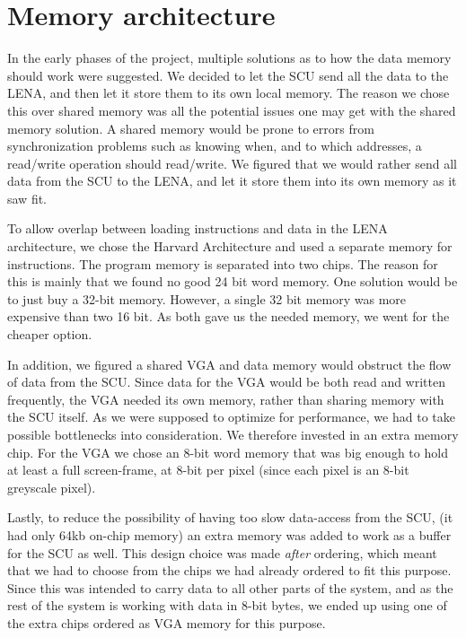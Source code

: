 \section {Memory architecture}

In the early phases of the project,
multiple solutions as to how the data memory should work were suggested. We
decided to let the \ac{SCU} send all the data to the \ac{LENA}, and then let it store
them to its own local memory. The reason we chose this over shared memory was
all the potential issues one may get with the shared memory solution. A shared memory
would be prone to errors from synchronization problems such as knowing when,
and to which addresses, a read/write operation should read/write. We figured
that we would rather send all data from the \ac{SCU} to the \ac{LENA}, and let it
store them into its own memory as it saw fit.

To allow overlap between loading instructions and data in the LENA
architecture, we chose the Harvard Architecture and used a separate memory for
instructions. The program memory is
separated into two chips. The reason for this is mainly that we found no good 24
bit word memory. One solution would be to just buy a 32-bit memory. However, a single 32
bit memory was more expensive than two 16 bit. As both gave us the needed memory,
we went for the cheaper option.

In addition, we figured a shared \ac{VGA} and data memory would obstruct the flow
of data from the \ac{SCU}. Since data for the \ac{VGA} would be both read and written
frequently, the \ac{VGA} needed its own memory, rather than sharing memory with
the SCU itself. As we were supposed to optimize for performance, we had to take
possible bottlenecks into consideration. We therefore invested in an extra
memory chip. For the VGA we chose an 8-bit word memory that was big enough to
hold at least a full screen-frame, at 8-bit per pixel (since each pixel is an 8-bit greyscale pixel).

Lastly, to reduce the possibility of having too slow data-access from the SCU, (it had only 64kb on-chip memory) 
an extra memory was added to work as a buffer for the SCU as well. This design choice was made {\em after} ordering, 
which meant that we had to choose from the chips we had already ordered to fit this purpose. Since this was intended 
to carry data to all other parts of the system, and as the rest of the system is working with data in 8-bit bytes, 
we ended up using one of the extra chips ordered as \ac{VGA} memory for this purpose.

